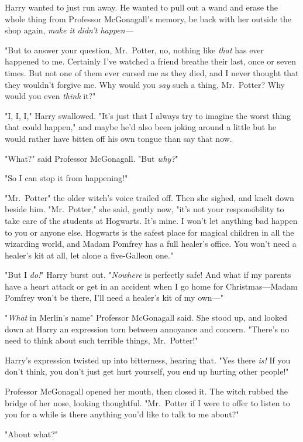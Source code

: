 Harry wanted to just run away. He wanted to pull out a wand and erase the whole
thing from Professor McGonagall's memory, be back with her outside the shop
again, \emph{make it didn't happen—}

"But to answer your question, Mr.~Potter, no, nothing like \emph{that} has ever
happened to me. Certainly I've watched a friend breathe their last, once or
seven times. But not one of them ever cursed me as they died, and I never
thought that they wouldn't forgive me. Why would you \emph{say} such a thing,
Mr.~Potter? Why would you even \emph{think} it?"

"I, I, I," Harry swallowed. "It's just that I always try to imagine the worst
thing that could happen," and maybe he'd also been joking around a little but
he would rather have bitten off his own tongue than say that now.

"What?" said Professor McGonagall. "But \emph{why?}"

"So I can stop it from happening!"

"Mr.~Potter{\el}" the older witch's voice trailed off. Then she sighed, and
knelt down beside him. "Mr.~Potter," she said, gently now, "it's not your
responsibility to take care of the students at Hogwarts. It's mine. I won't let
anything bad happen to you or anyone else. Hogwarts is the safest place for
magical children in all the wizarding world, and Madam Pomfrey has a full
healer's office. You won't need a healer's kit at all, let alone a five-Galleon
one."

"But I \emph{do!}" Harry burst out. "\emph{Nowhere} is perfectly safe! And what
if my parents have a heart attack or get in an accident when I go home for
Christmas—Madam Pomfrey won't be there, I'll need a healer's kit of my own—"

"\emph{What} in Merlin's name{\el}" Professor McGonagall said. She stood up,
and looked down at Harry an expression torn between annoyance and concern.
"There's no need to think about such terrible things, Mr.~Potter!"

Harry's expression twisted up into bitterness, hearing that. "Yes there
\emph{is!} If you don't think, you don't just get hurt yourself, you end up
hurting other people!"

Professor McGonagall opened her mouth, then closed it. The witch rubbed the
bridge of her nose, looking thoughtful. "Mr.~Potter{\el} if I were to offer
to listen to you for a while{\el} is there anything you'd like to talk to me
about?"

"About what?"

